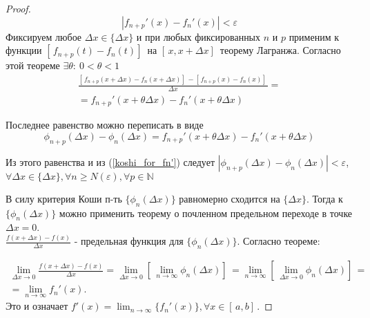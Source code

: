 \begin{proof}
    \begin{equation}\label{koshi_for_fn'}
        |f_{n+p}'(x) - f_n'(x)| < \varepsilon
    \end{equation}
    Фиксируем любое $\Delta x \in \{\Delta x\}$ и при любых фиксированных $n$ и $p$ применим к функции  $[\,f_{n+p}(t)-f_n(t)]\,$ на $[\,x, x+\Delta x]\,$ теорему Лагранжа. 
    Согласно этой теореме $\exists \theta: \ 0 < \theta < 1$  
    \begin{align*}
        \frac{[\,f_{n+p}(x + \Delta x) - f_n(x + \Delta x)]\, - [\,f_{n+p}(x) - f_n(x)]\,}{\Delta x} = \\ = f_{n+p}'(x + \theta \Delta x) - f_n'(x + \theta \Delta x)
    \end{align*}

    Последнее равенство можно переписать в виде
    \begin{equation*}
        \phi_{n+p}(\Delta x) - \phi_n(\Delta x) = f_{n+p}'(x + \theta \Delta x) - f_n'(x + \theta \Delta x)
    \end{equation*}

    Из этого равенства и из (\ref{koshi_for_fn'}) следует $|\phi_{n+p}(\Delta x) - \phi_n(\Delta x)| < \varepsilon$, $\forall \Delta x \in \{\Delta x\}, \forall n \ge N(\varepsilon), \forall p \in \mathbb{N}$


    В силу критерия Коши п-ть $\{\phi_n(\Delta x)\}$ равномерно сходится на $\{\Delta x\}$. Тогда к $\{\phi_n(\Delta x)\}$ можно применить теорему о почленном предельном переходе в точке  $\Delta x = 0$. \\
    $\frac{f(x + \Delta x) - f(x)}{\Delta x}$ - предельная функция для $\{\phi_n(\Delta x)\}$. Согласно теореме:
  
    \begin{align*}
        \lim_{\Delta x \rightarrow 0}{\frac{f(x + \Delta x) - f(x)}{\Delta x}} = \lim_{\Delta x \rightarrow 0}{[\,\lim_{n \rightarrow \infty}{\phi_n(\Delta x)}]\,} = \lim_{n \rightarrow \infty}{[\,\lim_{\Delta x \rightarrow 0}{\phi_n(\Delta x)}]\,} = \\ = \lim_{n \rightarrow \infty}{f_n'(x)}.
    \end{align*}
    Это и означает $f'(x) = \lim_{n \rightarrow \infty}{\{f_n'(x)\}}, \forall x \in [\,a,b]\,$.
\end{proof}



    

